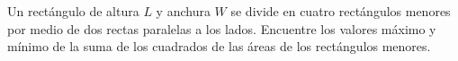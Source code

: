 \item Un rectángulo de altura $L$ y anchura $W$ se divide en cuatro rectángulos menores por medio de dos rectas paralelas a los lados. Encuentre los valores máximo y mínimo de la suma de los cuadrados de las áreas de los rectángulos menores.

